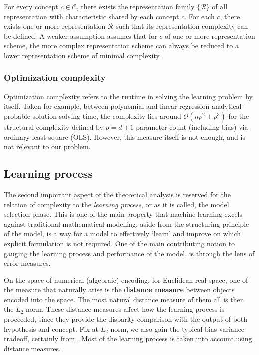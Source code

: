 \documentclass[twoside,10pt]{article}
\begin{document}
\begin{assumption}
    For every concept $c\in\mathcal{C}$, there exists the representation family $\{\mathcal{R}\}$ of all representation with characteristic shared by each concept $c$. For each $c$, there exists one or more representation $\mathcal{R}$ such that its representation complexity can be defined. A weaker assumption assumes that for $c$ of one or more representation scheme, the more complex representation scheme can always be reduced to a lower representation scheme of minimal complexity.
\end{assumption}



\subsubsection{Optimization complexity}

Optimization complexity refers to the runtime in solving the learning problem by itself. Taken for example, between polynomial and linear regression analytical-probable solution solving time, the complexity lies around $\mathcal{O}(np^{2}+p^{3})$ for the structural complexity defined by $p=d+1$ parameter count (including bias) via ordinary least square (OLS). However, this measure itself is not enough, and is not relevant to our problem. 


\subsection{Learning process}
The second important aspect of the theoretical analysis is reserved for the relation of complexity to the \textit{learning process}, or as it is called, the model selection phase. This is one of the main property that machine learning excels against traditional mathematical modelling, aside from the structuring principle of the model, is a way for a model to effectively `learn' and improve on which explicit formulation is not required. One of the main contributing notion to gauging the learning process and performance of the model, is through the lens of error measures. 

On the space of numerical (algebraic) encoding, for Euclidean real space, one of the measure that naturally arise is the \textbf{distance measure} between objects encoded into the space. The most natural distance measure of them all is then the $L_{2}$-norm. These distance measures affect how the learning process is proceeded, since they provide the disparity comparison with the output of both hypothesis and concept. Fix at $L_{2}$-norm, we also gain the typical bias-variance tradeoff, certainly from \cite{6797087}. Most of the learning process is taken into account using distance measures. 
\end{document}
